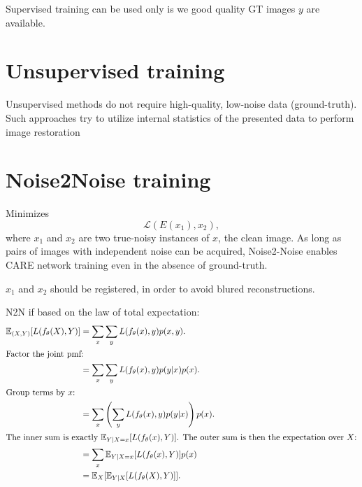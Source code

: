 Supervised training can be used only is we good quality GT images $y$
are
available. %

\section{Unsupervised training}

Unsupervised methods do not require high-quality, low-noise data
(ground-truth).  Such approaches try to utilize internal statistics of
the presented data to perform image
restoration %

\section{Noise2Noise training}


Minimizes
\begin{equation}
  {\mathcal L}(E(x_1),x_2),
\end{equation}
where $x_1$ and $x_2$ are two true-noisy instances of $x$, the clean
image. As long as pairs of images with independent noise can be
acquired, Noise2-Noise enables CARE network training even in the
absence of ground-truth. %

$x_1$ and $x_2$ should be registered, in order to avoid blured
reconstructions. %

N2N if based on the law of total expectation:
\begin{align*}
\mathbb{E}_{(X,Y)}[L(f_{\theta}(X),Y)] &= \sum_{x}\sum_{y}L(f_{\theta}(x),y) p(x,y). \\
\intertext{Factor the joint pmf:}
&= \sum_{x}\sum_{y}L(f_{\theta}(x),y) p(y|x) p(x). \\
\intertext{Group terms by $x$:}
&= \sum_{x}\left(\sum_{y}L(f_{\theta}(x),y) p(y|x)\right) p(x). \\
\intertext{The inner sum is exactly $\mathbb{E}_{Y|X=x}[L(f_{\theta}(x),Y)]$. The outer sum is then the expectation over $X$:}
&= \sum_{x} \mathbb{E}_{Y|X=x}[L(f_{\theta}(x),Y)] p(x) \\
                                       &= \mathbb{E}_{X}[\mathbb{E}_{Y|X}[L(f_{\theta}(X),Y)]].
                                         \label{eq:5}
\end{align*}


